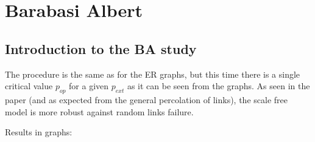 \chapter{Barabasi Albert}


\section{Introduction to the BA study}
The procedure is the same as for the ER graphs, but this time there is a single critical value $p_{op}$ for a given $p_{ext}$ as it can be seen from the graphs.
As seen in the paper (and as expected from the general percolation of links), the scale free model is more robust against random links failure.

Results in graphs:


\newpage